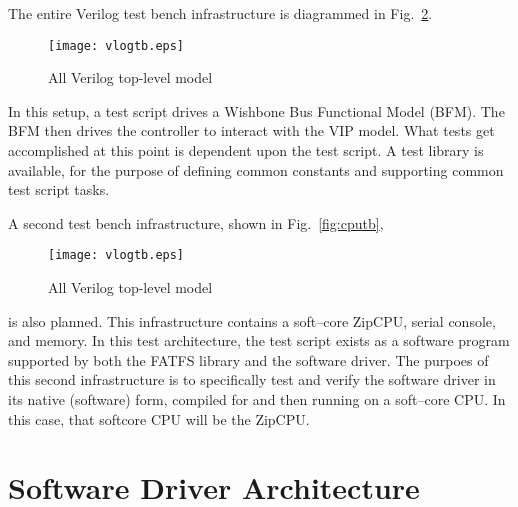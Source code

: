 \documentclass{gqtekspec}
\begin{document}
The entire Verilog test bench infrastructure is diagrammed in
Fig.~\ref{fig:vlogtb}.
\begin{figure}\begin{center}
\texttt{[image: vlogtb.eps]}
\caption{All Verilog top-level model}\label{fig:vlogtb}
\end{center}\end{figure}
In this setup, a test script drives a Wishbone Bus Functional Model (BFM).
The BFM then drives the controller to interact with the VIP model.
What tests get accomplished at this point is dependent upon the test script.
A test library is available, for the purpose of defining common constants
and supporting common test script tasks.

A second test bench infrastructure, shown in Fig.~\ref{fig:cputb},
\begin{figure}\begin{center}
\texttt{[image: vlogtb.eps]}
\caption{All Verilog top-level model}\label{fig:vlogtb}
\end{center}\end{figure}
is also planned.  This infrastructure contains a soft--core ZipCPU,
serial console, and memory.  In this test architecture, the test script
exists as a software program supported by both the FATFS library and the
software driver.  The purpoes of this second infrastructure is to specifically
test and verify the software driver in its native (software) form, compiled
for and then running on a soft--core CPU.  In this case, that softcore CPU
will be the ZipCPU.

\section{Software Driver Architecture}\label{sec:arch-swdrvr}
\end{document}
